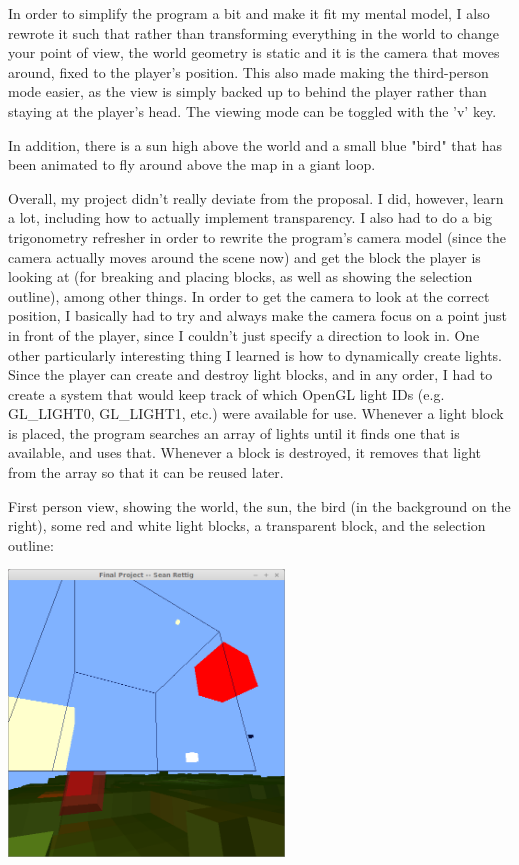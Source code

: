 \documentclass[12pt]{article}
\begin{document}
In order to simplify the program a bit and make it fit my mental model, I also
rewrote it such that rather than transforming everything in the world to change
your point of view, the world geometry is static and it is the camera that
moves around, fixed to the player's position.  This also made making the
third-person mode easier, as the view is simply backed up to behind the player
rather than staying at the player's head.  The viewing mode can be toggled with
the 'v' key.

In addition, there is a sun high above the world and a small blue "bird" that
has been animated to fly around above the map in a giant loop.

Overall, my project didn't really deviate from the proposal.  I did, however,
learn a lot, including how to actually implement transparency.  I also had to
do a big trigonometry refresher in order to rewrite the program's camera model
(since the camera actually moves around the scene now) and get the block the
player is looking at (for breaking and placing blocks, as well as showing the
selection outline), among other things.  In order to get the camera to look at
the correct position, I basically had to try and always make the camera focus
on a point just in front of the player, since I couldn't just specify a
direction to look in.  One other particularly interesting thing I learned is
how to dynamically create lights.  Since the player can create and destroy
light blocks, and in any order, I had to create a system that would keep track
of which OpenGL light IDs (e.g. GL\_LIGHT0, GL\_LIGHT1, etc.) were available
for use.  Whenever a light block is placed, the program searches an array of
lights until it finds one that is available, and uses that.  Whenever a block
is destroyed, it removes that light from the array so that it can be reused
later.

\pagebreak

First person view, showing the world, the sun, the bird (in the background on
the right), some red and white light blocks, a transparent block, and the
selection outline:

\includegraphics[width=0.55\textwidth]{screenshot1.png}
\end{document}
